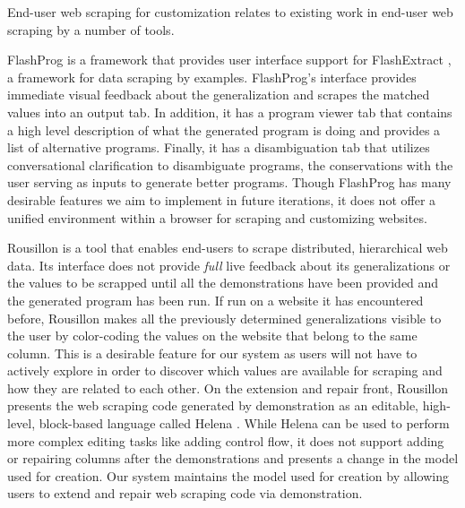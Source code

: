 \documentclass[sigconf,10pt]{acmart}
\begin{document}
End-user web scraping for customization relates to existing work in
end-user web scraping by a number of tools.

FlashProg \citep{mayer2015} is a framework that provides user interface
support for FlashExtract \citep{le2014}, a framework for data scraping
by examples. FlashProg's interface provides immediate visual feedback
about the generalization and scrapes the matched values into an output
tab. In addition, it has a program viewer tab that contains a high level
description of what the generated program is doing and provides a list
of alternative programs. Finally, it has a disambiguation tab that
utilizes conversational clarification to disambiguate programs, the
conservations with the user serving as inputs to generate better
programs. Though FlashProg has many desirable features we aim to
implement in future iterations, it does not offer a unified environment
within a browser for scraping and customizing websites.

Rousillon \citep{chasins2018} is a tool that enables end-users to scrape
distributed, hierarchical web data. Its interface does not provide
\emph{full} live feedback about its generalizations or the values to be
scrapped until all the demonstrations have been provided and the
generated program has been run. If run on a website it has encountered
before, Rousillon makes all the previously determined generalizations
visible to the user by color-coding the values on the website that
belong to the same column. This is a desirable feature for our system as
users will not have to actively explore in order to discover which
values are available for scraping and how they are related to each
other. On the extension and repair front, Rousillon presents the web
scraping code generated by demonstration as an editable, high-level,
block-based language called Helena \citep{zotero-51}. While Helena can
be used to perform more complex editing tasks like adding control flow,
it does not support adding or repairing columns after the demonstrations
and presents a change in the model used for creation. Our system
maintains the model used for creation by allowing users to extend and
repair web scraping code via demonstration.
\end{document}
